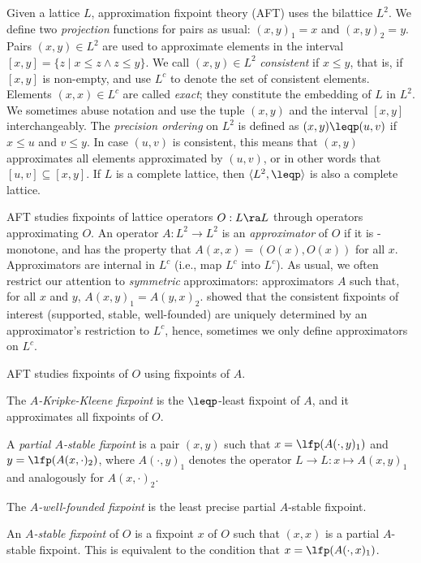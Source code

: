 Given a lattice $L$, approximation fixpoint theory (AFT) \cite{DeneckerMT00} uses the bilattice 
$L^2$.  We define two \emph{projection} functions for pairs as usual:
$(x,y)_1=x$ and $(x,y)_2=y$.  Pairs $(x,y)\in L^2$ are used to
approximate elements in the interval $[x,y] = \{z\mid x\leq
z\wedge z\leq y\}$. We call $(x,y)\in L^2$ \emph{consistent} if $x\leq 
y$, that is, if $[x,y]$ is non-empty, and use $L^c$ to denote the set
of consistent elements. Elements $(x,x) \in L^c$ are called
\emph{exact}; they constitute the embedding of $L$ in $L^2$.  We sometimes abuse notation and use the tuple $(x,y)$
and the interval $[x,y]$ interchangeably.  The \emph{precision
  ordering} on $L^2$ is defined as $(x,y) \leqp (u,v)$ if $x\leq u$
and $v\leq y$. In case $(u,v)$ is consistent, this means that $(x,y)$
approximates all elements approximated by $(u,v)$, or in other words
that $[u,v]\subseteq [x,y]$.  If $L$ is a complete lattice, then
$\langle L^2,\leqp\rangle$ is also a complete lattice.
  


AFT studies fixpoints of lattice operators $O:L\ra L$ through operators approximating $O$.
 An operator $A: L^2\to L^2$  is an \emph{approximator} of $O$ if it is \leqp-monotone,  and has the property that $A(x,x) = (O(x),O(x))$ for all $x$. %
Approximators are internal in $L^c$ (i.e., map $L^c$ into $L^c$).
As usual, we often restrict our attention to \emph{symmetric} approximators: approximators $A$ such that, for all $x$ and $y$, $A(x,y)_1 = A(y,x)_2$.%
\citet{DeneckerMT04} showed that the consistent fixpoints of interest (supported, stable, well-founded) are uniquely determined by an approximator's restriction to $L^c$, hence, sometimes we only define approximators on $L^c$. 

AFT studies fixpoints of $O$ using fixpoints of $A$. 
 \begin{compactitem}
  \item The \emph{$A$-Kripke-Kleene fixpoint} is the $\leqp$-least fixpoint of $A$, and it approximates all fixpoints of $O$. 
\item A \emph{partial $A$-stable fixpoint} is a pair  $(x,y)$ such that $x=\lfp(A(\cdot,y)_1)$ and $y=\lfp(A(x,\cdot)_2)$, where $A(\cdot,y)_1$ denotes the operator $L\to L:x\mapsto A(x,y)_1$ and analogously for $A(x,\cdot)_2$. 
\item The \emph{$A$-well-founded fixpoint} is the least precise partial $A$-stable fixpoint. 
\item  An \emph{$A$-stable fixpoint} of $O$ is a fixpoint $x$ of $O$ such that $(x,x)$ is a partial $A$-stable fixpoint. This is equivalent to the condition that $x=\lfp(A(\cdot, x)_1)$.
 \end{compactitem}

